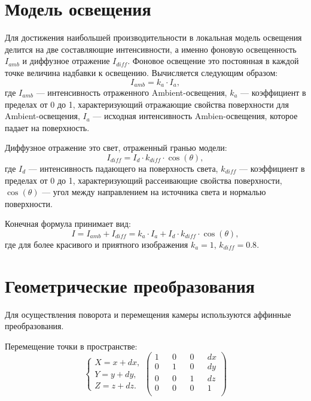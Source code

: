 
\FloatBarrier

\section{Модель освещения}

Для достижения наибольшей производительности в локальная модель освещения делится на две составляющие интенсивности, а именно фоновую освещенность $I_{amb}$ и диффузное отражение $I_{diff}$. Фоновое освещение это постоянная в каждой точке величина надбавки к освещению. Вычисляется следующим образом:
\begin{equation*}
	I_{amb} = k_{a} \cdot I_{a},
\end{equation*}
где $I_{amb}$ --- интенсивность отраженного Ambient-освещения, $k_{a}$ --- коэффициент в пределах от 0 до 1, характеризующий отражающие свойства поверхности для Ambient-освещения, $I_{a}$ --- исходная интенсивность Ambien-освещения, которое падает на поверхность.

Диффузное отражение это свет, отраженный гранью модели:
\begin{equation*}
	I_{diff} = I_{d} \cdot k_{diff} \cdot \cos(\theta),
\end{equation*}
где $I_{d}$ --- интенсивность падающего на поверхность света, $k_{diff}$ --- коэффициент в пределах от 0 до 1, характеризующий рассеивающие свойства поверхности, $\cos(\theta)$ --- угол между направлением на источника света и нормалью поверхности.

Конечная формула принимает вид:
\begin{equation*}
	I = I_{amb} + I_{diff} = k_{a} \cdot I_{a} + I_{d} \cdot k_{diff} \cdot \cos(\theta), 
\end{equation*}
где для более красивого и приятного изображения $k_{a} = 1$, $k_{diff} = 0.8$.

\section{Геометрические преобразования}

Для осуществления поворота и перемещения камеры используются аффинные преобразования.

Перемещение точки в пространстве:
\begin{equation*}
	\begin{cases}
		X = x + dx, \\
		Y = y + dy, \\
		Z = z + dz.
	\end{cases}
	\begin{pmatrix}
		1 && 0 && 0 && dx \\
		0 && 1 && 0 && dy \\
		0 && 0 && 1 && dz \\
		0 && 0 && 0 && 1 \\
	\end{pmatrix}
\end{equation*}


